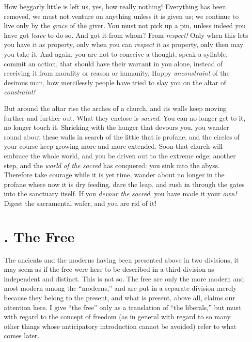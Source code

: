 \documentclass[12pt,a4paper]{book}
\begin{document}
How beggarly little is left us, yes, how really nothing! Everything has been 
removed, we must not venture on anything unless it is given us; we continue to 
live only by the \textit{grace} of the giver. You must not pick up a pin, 
unless indeed you have got \textit{leave} to do so. And got it from whom? From 
\textit{respect!} Only when this lets you have it as property, only when you 
can \textit{respect} it as property, only then may you take it. And again, you 
are not to conceive a thought, speak a syllable, commit an action, that should 
have their warrant in you alone, instead of receiving it from morality or 
reason or humanity. Happy \textit{unconstraint} of the desirous man, how 
mercilessly people have tried to slay you on the altar of \textit{constraint!}

But around the altar rise the arches of a church, and its walls keep moving 
further and further out. What they enclose is \textit{sacred}. You can no 
longer get to it, no longer touch it. Shrieking with the hunger that devours 
you, you wander round about these walls in search of the little that is 
profane, and the circles of your course keep growing more and more extended. 
Soon that church will embrace the whole world, and you be driven out to the 
extreme edge; another step, and the \textit{world of the sacred} has 
conquered: you sink into the abyss. Therefore take courage while it is yet 
time, wander about no longer in the profane where now it is dry feeding, dare 
the leap, and rush in through the gates into the sanctuary itself. If you 
\textit{devour the sacred}, you have made it your \textit{own!} Digest the 
sacramental wafer, and you are rid of it!

\section[3. The Free]{. The Free}

The ancients and the moderns having been presented above in two divisions, it 
may seem as if the free were here to be described in a third division as 
independent and distinct. This is not so. The free are only the more modern 
and most modern among the ``moderns,'' and are put in a separate division 
merely because they belong to the present, and what is present, above all, 
claims our attention here. I give ``the free'' only as a translation of 
``the liberals,'' but must with regard to the concept of freedom (as in 
general with regard to so many other things whose anticipatory introduction 
cannot be avoided) refer to what comes later.
\end{document}
